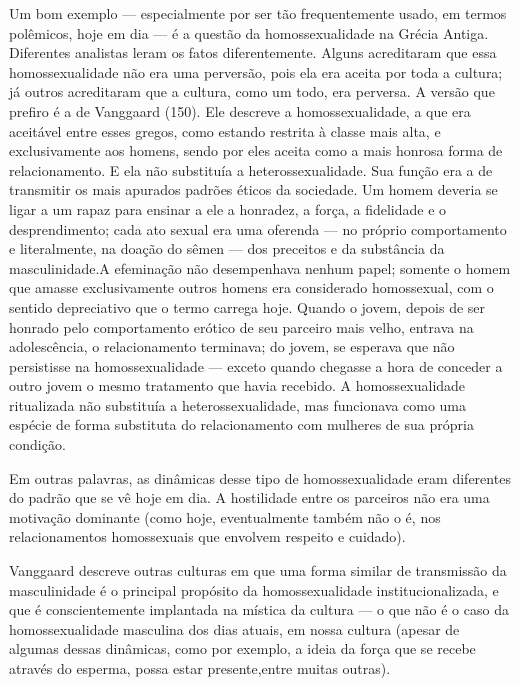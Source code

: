 Um bom exemplo --- especialmente por ser tão frequentemente usado, em
termos polêmicos, hoje em dia --- é a questão da homossexualidade\idxhomosgrec{} na
Grécia Antiga.\idxgreci{} Diferentes analistas leram os fatos diferentemente.
Alguns acreditaram que essa homossexualidade não era uma perversão,
pois ela era aceita por toda a cultura; já outros acreditaram que a
cultura, como um todo, era perversa. A versão que prefiro é a de
Vanggaard\idxvangg{} (150). Ele descreve a homossexualidade, a que era aceitável
entre esses gregos, como estando restrita à classe mais alta, e
exclusivamente aos homens, sendo por eles aceita como a mais honrosa
forma de relacionamento. E ela não substituía a heterossexualidade. Sua
função era a de transmitir os mais apurados padrões éticos da
sociedade. Um homem deveria se ligar a um rapaz para ensinar a ele a
honradez, a força, a fidelidade e o desprendimento; cada ato sexual era
uma oferenda --- no próprio comportamento e literalmente, na doação do
sêmen --- dos preceitos e da substância da masculinidade.\idxmascuhom[|(] A efeminação
não desempenhava nenhum papel; somente o homem que amasse
exclusivamente outros homens era considerado homossexual, com o sentido
depreciativo que o termo carrega hoje. Quando o jovem, depois de ser
honrado pelo comportamento erótico de seu parceiro mais velho, entrava
na adolescência, o relacionamento terminava; do jovem, se esperava que
não persistisse na homossexualidade --- exceto quando chegasse a hora de
conceder a outro jovem o mesmo tratamento que havia recebido. A
homossexualidade ritualizada não substituía a heterossexualidade, mas
funcionava como uma espécie de forma substituta do relacionamento com
mulheres de sua própria condição.

Em outras palavras, as dinâmicas desse tipo de homossexualidade eram
diferentes do padrão que se vê hoje em dia. A hostilidade entre os
parceiros não era uma motivação dominante (como hoje, eventualmente
também não o é, nos relacionamentos homossexuais que envolvem respeito
e cuidado).

Vanggaard\idxvangg{} descreve outras culturas em que uma forma similar de
transmissão da masculinidade é o principal propósito da
homossexualidade institucionalizada, e que é conscientemente implantada
na mística da cultura --- o que não é o caso da homossexualidade
masculina dos dias atuais, em nossa cultura (apesar de algumas dessas
dinâmicas, como por exemplo, a ideia da força que se recebe através do
esperma, possa estar presente,\idxmascuhom[|)] entre muitas outras).

